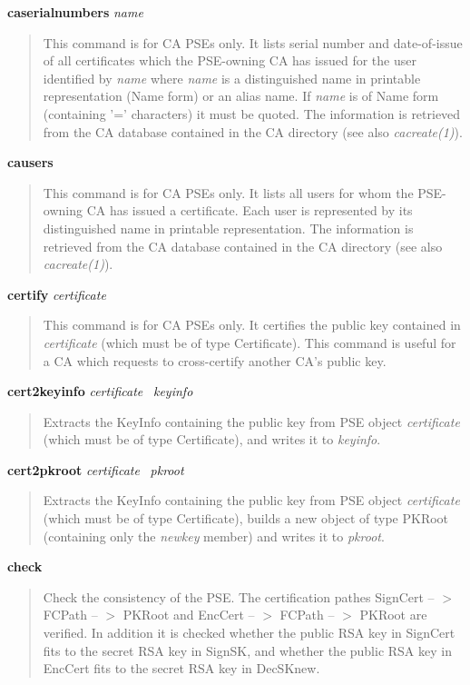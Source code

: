 {\bf caserialnumbers} {\em name}
\begin{quote}
This command is for CA PSEs only.
It lists serial number and date-of-issue of all certificates which the PSE-owning CA has 
issued for the user identified by {\em name} where {\em name} is a distinguished name in 
printable representation (Name form) or an alias name. If {\em name} is of Name form
(containing '=' characters) it must be quoted. The information is retrieved from the 
CA database contained in the CA
directory (see also {\em cacreate(1)}).
\end{quote}

{\bf causers}
\begin{quote}
This command is for CA PSEs only.
It lists all users for whom the PSE-owning CA has issued a certificate. Each user is represented 
by its distinguished name in printable representation. The information is retrieved from the CA database
contained in the CA directory (see also {\em cacreate(1)}).
\end{quote}

{\bf certify} {\em certificate}
\begin{quote}
This command is for CA PSEs only.
It certifies the public key contained in {\em certificate} (which must be of type Certificate).
This command is useful for a CA which requests to cross-certify another CA's public key.
\end{quote}

{\bf cert2keyinfo} {\em certificate}~ {\em keyinfo}
\begin{quote}
Extracts the KeyInfo containing the public key from PSE object {\em certificate} 
(which must be of type Certificate), and writes it to {\em keyinfo}.
\end{quote}

{\bf cert2pkroot} {\em certificate}~ {\em pkroot}
\begin{quote}
Extracts the KeyInfo containing the public key from PSE object {\em certificate} 
(which must be of type Certificate), builds a new object of type PKRoot (containing
only the {\em newkey} member) and writes it to {\em pkroot}.
\end{quote}

{\bf check}
\begin{quote}
Check the consistency of the PSE. The certification pathes SignCert -- $>$ FCPath -- $>$ PKRoot
and EncCert -- $>$ FCPath -- $>$ PKRoot are verified. In addition it is checked whether
the public RSA key in SignCert fits to the secret RSA key in SignSK, and whether the
public RSA key in EncCert fits to the secret RSA key in DecSKnew.
\end{quote}

